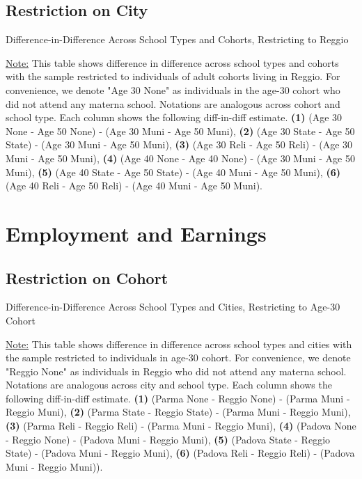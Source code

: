 \documentclass[11pt]{article}
\begin{document}
\subsection{Restriction on City}
\begin{table}[H]
\begin{center}
	\caption{Difference-in-Difference Across School Types and Cohorts, Restricting to Reggio}
	\scalebox{0.80}{
		}
\end{center}
\footnotesize
\underline{Note:} This table shows difference in difference across school types and cohorts with the sample restricted to individuals of adult cohorts living in Reggio. For convenience, we denote "Age 30 None" as individuals in the age-30 cohort who did not attend any materna school. Notations are analogous across cohort and school type. Each column shows the following diff-in-diff estimate. \textbf{(1)} (Age 30 None - Age 50 None) - (Age 30 Muni - Age 50 Muni), \textbf{(2)} (Age 30 State - Age 50 State) - (Age 30 Muni - Age 50 Muni), \textbf{(3)} (Age 30 Reli - Age 50 Reli) - (Age 30 Muni - Age 50 Muni), \textbf{(4)} (Age 40 None - Age 40 None) - (Age 30 Muni - Age 50 Muni),  \textbf{(5)} (Age 40 State - Age 50 State) - (Age 40 Muni - Age 50 Muni), \textbf{(6)} (Age 40 Reli - Age 50 Reli) - (Age 40 Muni - Age 50 Muni). 
\end{table}


\section{Employment and Earnings}
\subsection{Restriction on Cohort}
\begin{table}[H]
\begin{center}
	\caption{Difference-in-Difference Across School Types and Cities, Restricting to Age-30 Cohort}
	\scalebox{0.80}{
		}
\end{center}
\footnotesize
\underline{Note:} This table shows difference in difference across school types and cities with the sample restricted to individuals in age-30 cohort. For convenience, we denote "Reggio None" as individuals in Reggio who did not attend any materna school. Notations are analogous across city and school type. Each column shows the following diff-in-diff estimate. \textbf{(1)} (Parma None - Reggio None) - (Parma Muni - Reggio Muni), \textbf{(2)} (Parma State - Reggio State) - (Parma Muni - Reggio Muni), \textbf{(3)} (Parma Reli - Reggio Reli) - (Parma Muni - Reggio Muni), \textbf{(4)} (Padova None - Reggio None) - (Padova Muni - Reggio Muni),  \textbf{(5)} (Padova State - Reggio State) - (Padova Muni - Reggio Muni), \textbf{(6)} (Padova Reli - Reggio Reli) - (Padova Muni - Reggio Muni)). 
\end{table}
\end{document}
